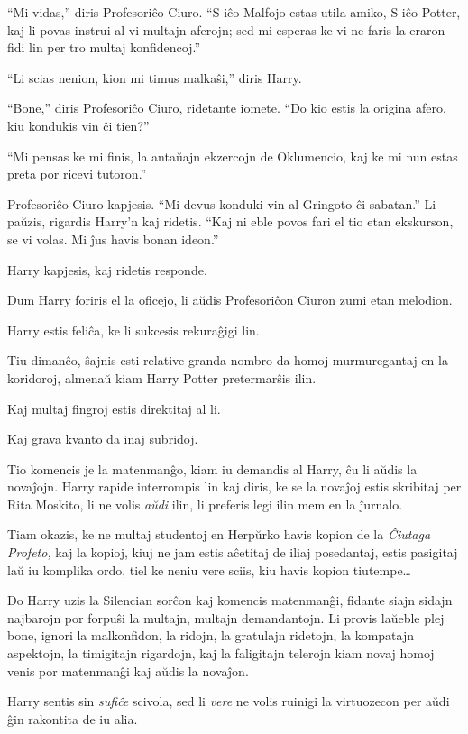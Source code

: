 ``Mi vidas,'' diris Profesoriĉo Ciuro. ``S-iĉo Malfojo estas utila amiko, S-iĉo
Potter, kaj li povas instrui al vi multajn aferojn; sed mi esperas ke vi ne
faris la eraron fidi lin per tro multaj konfidencoj.''

``Li scias nenion, kion mi timus malkaŝi,'' diris Harry.

``Bone,'' diris Profesoriĉo Ciuro, ridetante iomete. ``Do kio estis la origina
afero, kiu kondukis vin ĉi tien?''

``Mi pensas ke mi finis, la antaŭajn ekzercojn de Oklumencio, kaj ke mi nun
estas preta por ricevi tutoron.''

Profesoriĉo Ciuro kapjesis. ``Mi devus konduki vin al Gringoto ĉi-sabatan.'' Li
paŭzis, rigardis Harry'n kaj ridetis. ``Kaj ni eble povos fari el tio etan
ekskurson, se vi volas. Mi ĵus havis bonan ideon.''

Harry kapjesis, kaj ridetis responde.

Dum Harry foriris el la oficejo, li aŭdis Profesoriĉon Ciuron zumi etan
melodion.

Harry estis feliĉa, ke li sukcesis rekuraĝigi lin.

\later

Tiu dimanĉo, ŝajnis esti relative granda nombro da homoj murmuregantaj en la
koridoroj, almenaŭ kiam Harry Potter pretermarŝis ilin.

Kaj multaj fingroj estis direktitaj al li.

Kaj grava kvanto da inaj subridoj.

Tio komencis je la matenmanĝo, kiam iu demandis al Harry, ĉu li aŭdis la
novaĵojn. Harry rapide interrompis lin kaj diris, ke se la novaĵoj estis
skribitaj per Rita Moskito, li ne volis \emph{aŭdi} ilin, li preferis legi ilin
mem en la ĵurnalo.

Tiam okazis, ke ne multaj studentoj en Herpŭrko havis kopion de la \emph{Ĉiutaga
Profeto,} kaj la kopioj, kiuj ne jam estis aĉetitaj de iliaj posedantaj, estis
pasigitaj laŭ iu komplika ordo, tiel ke neniu vere sciis, kiu havis kopion
tiutempe\ldots{}

Do Harry uzis la Silencian sorĉon kaj komencis matenmanĝi, fidante siajn sidajn
najbarojn por forpuŝi la multajn, multajn demandantojn. Li provis laŭeble plej
bone, ignori la malkonfidon, la ridojn, la gratulajn ridetojn, la kompatajn
aspektojn, la timigitajn rigardojn, kaj la faligitajn telerojn kiam novaj homoj
venis por matenmanĝi kaj aŭdis la novaĵon.

Harry sentis sin \emph{sufiĉe} scivola, sed li \emph{vere} ne volis ruinigi la
virtuozecon per aŭdi ĝin rakontita de iu alia.


